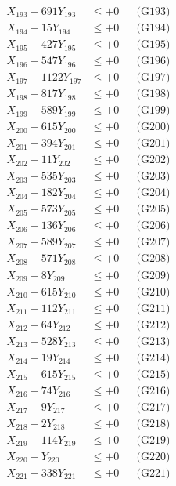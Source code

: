 \documentclass[a4paper,10pt]{article}
\begin{document}
{\begin{align}
X_{193} - 691Y_{193} &\leq +0 && \text{(G193)} \\
X_{194} - 15Y_{194} &\leq +0 && \text{(G194)} \\
X_{195} - 427Y_{195} &\leq +0 && \text{(G195)} \\
X_{196} - 547Y_{196} &\leq +0 && \text{(G196)} \\
X_{197} - 1122Y_{197} &\leq +0 && \text{(G197)} \\
X_{198} - 817Y_{198} &\leq +0 && \text{(G198)} \\
X_{199} - 589Y_{199} &\leq +0 && \text{(G199)} \\
X_{200} - 615Y_{200} &\leq +0 && \text{(G200)} \\
\allowbreak
X_{201} - 394Y_{201} &\leq +0 && \text{(G201)} \\
X_{202} - 11Y_{202} &\leq +0 && \text{(G202)} \\
X_{203} - 535Y_{203} &\leq +0 && \text{(G203)} \\
X_{204} - 182Y_{204} &\leq +0 && \text{(G204)} \\
X_{205} - 573Y_{205} &\leq +0 && \text{(G205)} \\
X_{206} - 136Y_{206} &\leq +0 && \text{(G206)} \\
X_{207} - 589Y_{207} &\leq +0 && \text{(G207)} \\
X_{208} - 571Y_{208} &\leq +0 && \text{(G208)} \\
X_{209} - 8Y_{209} &\leq +0 && \text{(G209)} \\
X_{210} - 615Y_{210} &\leq +0 && \text{(G210)} \\
\allowbreak
X_{211} - 112Y_{211} &\leq +0 && \text{(G211)} \\
X_{212} - 64Y_{212} &\leq +0 && \text{(G212)} \\
X_{213} - 528Y_{213} &\leq +0 && \text{(G213)} \\
X_{214} - 19Y_{214} &\leq +0 && \text{(G214)} \\
X_{215} - 615Y_{215} &\leq +0 && \text{(G215)} \\
X_{216} - 74Y_{216} &\leq +0 && \text{(G216)} \\
X_{217} - 9Y_{217} &\leq +0 && \text{(G217)} \\
X_{218} - 2Y_{218} &\leq +0 && \text{(G218)} \\
X_{219} - 114Y_{219} &\leq +0 && \text{(G219)} \\
X_{220} - Y_{220} &\leq +0 && \text{(G220)} \\
\allowbreak
X_{221} - 338Y_{221} &\leq +0 && \text{(G221)} \\

\end{align}}
\end{document}
